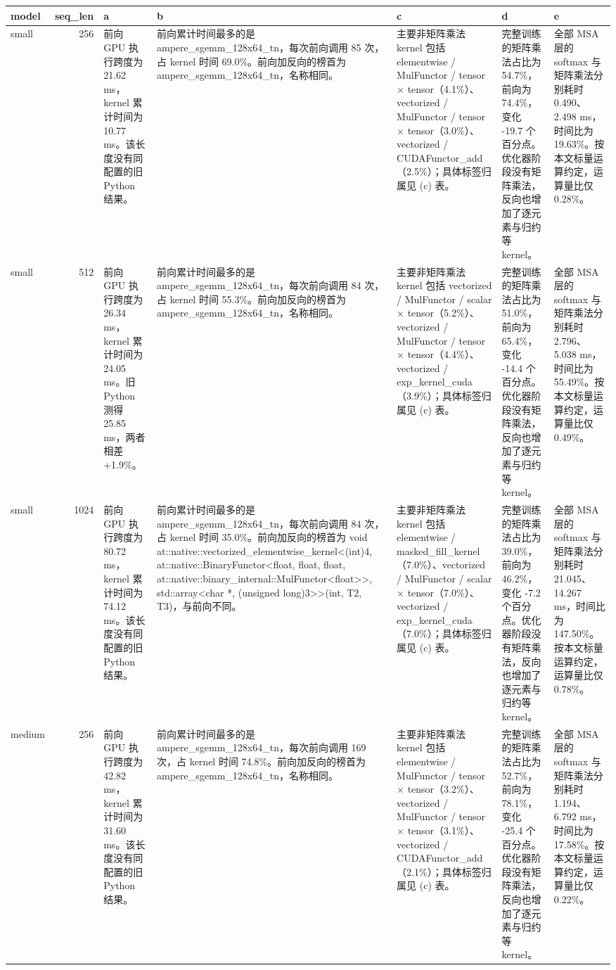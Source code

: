 \begin{tabular}{lrlllll}
\toprule
model & seq\_len & a & b & c & d & e \\
\midrule
small & 256 & 前向 GPU 执行跨度为 21.62 ms，kernel 累计时间为 10.77 ms。该长度没有同配置的旧 Python 结果。 & 前向累计时间最多的是 ampere\_sgemm\_128x64\_tn，每次前向调用 85 次，占 kernel 时间 69.0\%。前向加反向的榜首为 ampere\_sgemm\_128x64\_tn，名称相同。 & 主要非矩阵乘法 kernel 包括 elementwise / MulFunctor / tensor × tensor（4.1\%）、vectorized / MulFunctor / tensor × tensor（3.0\%）、vectorized / CUDAFunctor\_add（2.5\%）；具体标签归属见 (c) 表。 & 完整训练的矩阵乘法占比为 54.7\%，前向为 74.4\%，变化 -19.7 个百分点。优化器阶段没有矩阵乘法，反向也增加了逐元素与归约等 kernel。 & 全部 MSA 层的 softmax 与矩阵乘法分别耗时 0.490、2.498 ms，时间比为 19.63\%。按本文标量运算约定，运算量比仅 0.28\%。 \\
small & 512 & 前向 GPU 执行跨度为 26.34 ms，kernel 累计时间为 24.05 ms。旧 Python 测得 25.85 ms，两者相差 +1.9\%。 & 前向累计时间最多的是 ampere\_sgemm\_128x64\_tn，每次前向调用 84 次，占 kernel 时间 55.3\%。前向加反向的榜首为 ampere\_sgemm\_128x64\_tn，名称相同。 & 主要非矩阵乘法 kernel 包括 vectorized / MulFunctor / scalar × tensor（5.2\%）、vectorized / MulFunctor / tensor × tensor（4.4\%）、vectorized / exp\_kernel\_cuda（3.9\%）；具体标签归属见 (c) 表。 & 完整训练的矩阵乘法占比为 51.0\%，前向为 65.4\%，变化 -14.4 个百分点。优化器阶段没有矩阵乘法，反向也增加了逐元素与归约等 kernel。 & 全部 MSA 层的 softmax 与矩阵乘法分别耗时 2.796、5.038 ms，时间比为 55.49\%。按本文标量运算约定，运算量比仅 0.49\%。 \\
small & 1024 & 前向 GPU 执行跨度为 80.72 ms，kernel 累计时间为 74.12 ms。该长度没有同配置的旧 Python 结果。 & 前向累计时间最多的是 ampere\_sgemm\_128x64\_tn，每次前向调用 84 次，占 kernel 时间 35.0\%。前向加反向的榜首为 void at::native::vectorized\_elementwise\_kernel<(int)4, at::native::BinaryFunctor<float, float, float, at::native::binary\_internal::MulFunctor<float>>, std::array<char *, (unsigned long)3>>(int, T2, T3)，与前向不同。 & 主要非矩阵乘法 kernel 包括 elementwise / masked\_fill\_kernel（7.0\%）、vectorized / MulFunctor / scalar × tensor（7.0\%）、vectorized / exp\_kernel\_cuda（7.0\%）；具体标签归属见 (c) 表。 & 完整训练的矩阵乘法占比为 39.0\%，前向为 46.2\%，变化 -7.2 个百分点。优化器阶段没有矩阵乘法，反向也增加了逐元素与归约等 kernel。 & 全部 MSA 层的 softmax 与矩阵乘法分别耗时 21.045、14.267 ms，时间比为 147.50\%。按本文标量运算约定，运算量比仅 0.78\%。 \\
medium & 256 & 前向 GPU 执行跨度为 42.82 ms，kernel 累计时间为 31.60 ms。该长度没有同配置的旧 Python 结果。 & 前向累计时间最多的是 ampere\_sgemm\_128x64\_tn，每次前向调用 169 次，占 kernel 时间 74.8\%。前向加反向的榜首为 ampere\_sgemm\_128x64\_tn，名称相同。 & 主要非矩阵乘法 kernel 包括 elementwise / MulFunctor / tensor × tensor（3.2\%）、vectorized / MulFunctor / tensor × tensor（3.1\%）、vectorized / CUDAFunctor\_add（2.1\%）；具体标签归属见 (c) 表。 & 完整训练的矩阵乘法占比为 52.7\%，前向为 78.1\%，变化 -25.4 个百分点。优化器阶段没有矩阵乘法，反向也增加了逐元素与归约等 kernel。 & 全部 MSA 层的 softmax 与矩阵乘法分别耗时 1.194、6.792 ms，时间比为 17.58\%。按本文标量运算约定，运算量比仅 0.22\%。 \\

\end{tabular}
